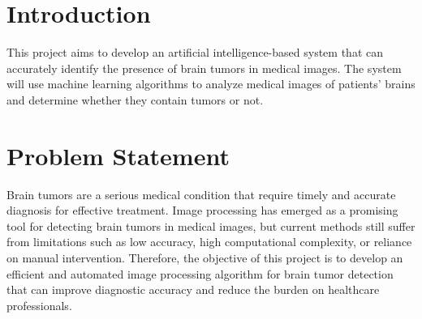 \documentclass{article}
\title{}
\date{}
\author{}
\begin{document}
\maketitle
\tableofcontents
\newpage
\section{Introduction}
This project aims to develop an artificial intelligence-based system that can accurately identify the presence of brain tumors in medical images. The system will use machine learning algorithms to analyze medical images of patients' brains and determine whether they contain tumors or not.
\section{Problem Statement}
Brain tumors are a serious medical condition that require timely and accurate diagnosis for effective treatment. Image processing has emerged as a promising tool for detecting brain tumors in medical images, but current methods still suffer from limitations such as low accuracy, high computational complexity, or reliance on manual intervention. Therefore, the objective of this project is to develop an efficient and automated image processing algorithm for brain tumor detection that can improve diagnostic accuracy and reduce the burden on healthcare professionals.
\end{document}
